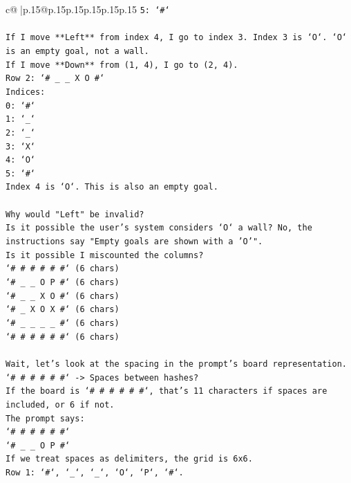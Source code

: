 \documentclass{article}
\begin{document}
{\begin{supertabular}{c@{$\;$}|p{.15\linewidth}@{}p{.15\linewidth}p{.15\linewidth}p{.15\linewidth}p{.15\linewidth}p{.15\linewidth}}
{{{\texttt{5: `\#`} \\
\\ 
\texttt{If I move **Left** from index 4, I go to index 3. Index 3 is `O`. `O` is an empty goal, not a wall.} \\
\texttt{If I move **Down** from (1, 4), I go to (2, 4).} \\
\texttt{Row 2: `\# \_ \_ X O \#`} \\
\texttt{Indices:} \\
\texttt{0: `\#`} \\
\texttt{1: `\_`} \\
\texttt{2: `\_`} \\
\texttt{3: `X`} \\
\texttt{4: `O`} \\
\texttt{5: `\#`} \\
\texttt{Index 4 is `O`. This is also an empty goal.} \\
\\ 
\texttt{Why would "Left" be invalid?} \\
\texttt{Is it possible the user's system considers `O` a wall? No, the instructions say "Empty goals are shown with a 'O'".} \\
\texttt{Is it possible I miscounted the columns?} \\
\texttt{`\# \# \# \# \# \#` (6 chars)} \\
\texttt{`\# \_ \_ O P \#` (6 chars)} \\
\texttt{`\# \_ \_ X O \#` (6 chars)} \\
\texttt{`\# \_ X O X \#` (6 chars)} \\
\texttt{`\# \_ \_ \_ \_ \#` (6 chars)} \\
\texttt{`\# \# \# \# \# \#` (6 chars)} \\
\\ 
\texttt{Wait, let's look at the spacing in the prompt's board representation.} \\
\texttt{`\# \# \# \# \# \#` {-}> Spaces between hashes?} \\
\texttt{If the board is `\# \# \# \# \# \#`, that's 11 characters if spaces are included, or 6 if not.} \\
\texttt{The prompt says:} \\
\texttt{`\# \# \# \# \# \#`} \\
\texttt{`\# \_ \_ O P \#`} \\
\texttt{If we treat spaces as delimiters, the grid is 6x6.} \\
\texttt{Row 1: `\#`, `\_`, `\_`, `O`, `P`, `\#`.} \\
}}}
\end{supertabular}}
\end{document}

